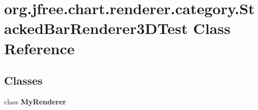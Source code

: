 \hypertarget{classorg_1_1jfree_1_1chart_1_1renderer_1_1category_1_1_stacked_bar_renderer3_d_test}{}\section{org.\+jfree.\+chart.\+renderer.\+category.\+Stacked\+Bar\+Renderer3\+D\+Test Class Reference}
\label{classorg_1_1jfree_1_1chart_1_1renderer_1_1category_1_1_stacked_bar_renderer3_d_test}
\subsection*{Classes}
\begin{DoxyCompactItemize}
\item 
class {\bfseries My\+Renderer}
\end{DoxyCompactItemize}

